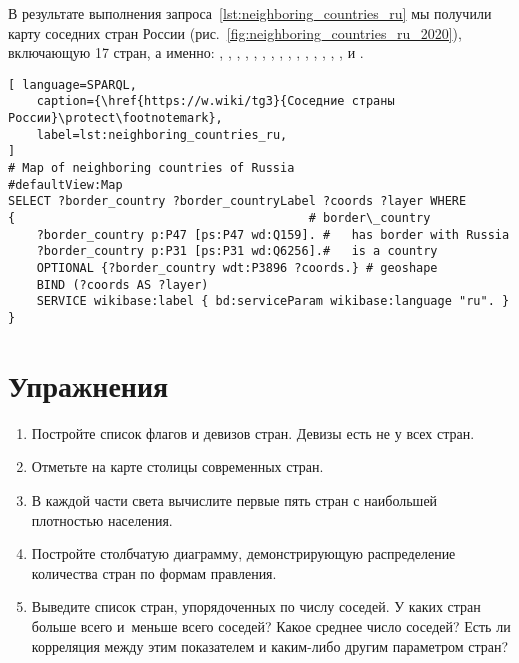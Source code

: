 В результате выполнения запроса~\ref{lst:neighboring_countries_ru} мы получили 
карту соседних стран России 
(рис.~\ref{fig:neighboring_countries_ru_2020}), включающую 17 стран, а именно: 
, , , , , , , , , , , , , , ,  и .


\begin{lstlisting}[ language=SPARQL, 
    caption={\href{https://w.wiki/tg3}{Соседние страны России}\protect\footnotemark},
    label=lst:neighboring_countries_ru, 
]
# Map of neighboring countries of Russia
#defaultView:Map
SELECT ?border_country ?border_countryLabel ?coords ?layer WHERE 
{                                         # border\_country
	?border_country p:P47 [ps:P47 wd:Q159]. #   has border with Russia
	?border_country p:P31 [ps:P31 wd:Q6256].#   is a country
	OPTIONAL {?border_country wdt:P3896 ?coords.} # geoshape
	BIND (?coords AS ?layer)
	SERVICE wikibase:label { bd:serviceParam wikibase:language "ru". }
}
\end{lstlisting}


\section{Упражнения}

\begin{enumerate}[noitemsep,topsep=0pt]
	\item Постройте список флагов и девизов стран. Девизы есть не у всех стран.
	\item Отметьте на карте столицы современных стран.
	\item В каждой части света вычислите первые пять стран с наибольшей плотностью населения.
	\item Постройте столбчатую диаграмму, демонстрирующую распределение количества стран по формам правления.
	\item Выведите список стран, упорядоченных по числу соседей. 
        У каких стран больше всего и~меньше всего соседей? Какое среднее число соседей? 
        Есть ли корреляция между этим показателем и каким-либо другим параметром стран?
\end{enumerate}
